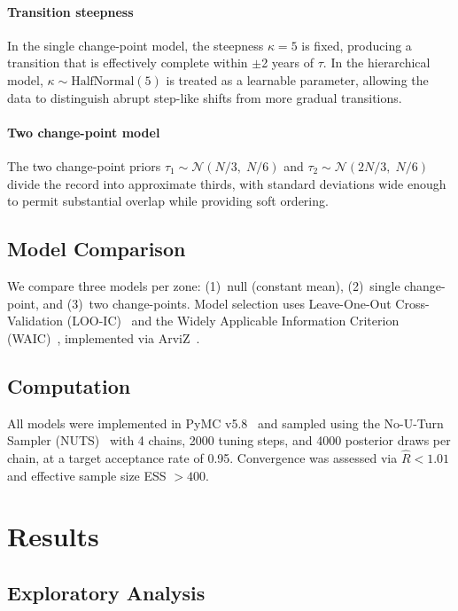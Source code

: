 \documentclass[conference]{IEEEtran}
\begin{document}
\paragraph{Transition steepness}
In the single change-point model, the steepness $\kappa = 5$ is fixed, producing a transition that is effectively complete within $\pm$2 years of $\tau$. In the hierarchical model, $\kappa \sim \text{HalfNormal}(5)$ is treated as a learnable parameter, allowing the data to distinguish abrupt step-like shifts from more gradual transitions.

\paragraph{Two change-point model}
The two change-point priors $\tau_1 \sim \mathcal{N}(N/3,\; N/6)$ and $\tau_2 \sim \mathcal{N}(2N/3,\; N/6)$ divide the record into approximate thirds, with standard deviations wide enough to permit substantial overlap while providing soft ordering.

\subsection{Model Comparison}

We compare three models per zone: (1)~null (constant mean), (2)~single change-point, and (3)~two change-points. Model selection uses Leave-One-Out Cross-Validation (LOO-IC)~\cite{vehtari2017practical} and the Widely Applicable Information Criterion (WAIC)~\cite{watanabe2010asymptotic}, implemented via ArviZ~\cite{kumar2019arviz}.

\subsection{Computation}

All models were implemented in PyMC v5.8~\cite{salvatier2016probabilistic} and sampled using the No-U-Turn Sampler (NUTS)~\cite{hoffman2014no} with 4 chains, 2000 tuning steps, and 4000 posterior draws per chain, at a target acceptance rate of 0.95. Convergence was assessed via $\hat{R} < 1.01$ and effective sample size ESS $> 400$.

\section{Results}

\subsection{Exploratory Analysis}
\end{document}
